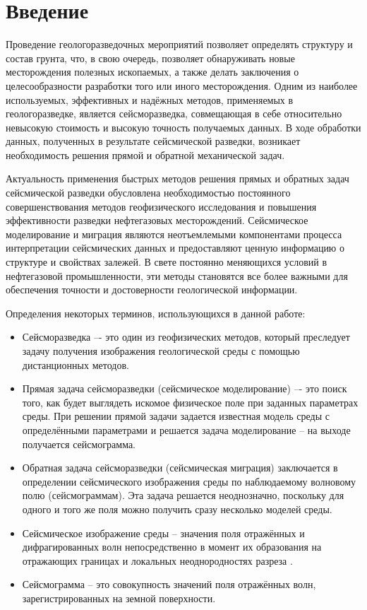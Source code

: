 \documentclass[a4paper, fontsize=14pt]{article}
\begin{document}
 
	\tableofcontents
	\newpage
	\section*{Введение} 
	
	Проведение геологоразведочных мероприятий позволяет определять структуру
	и состав грунта, что, в свою очередь, позволяет обнаруживать новые
	месторождения полезных ископаемых, а также делать заключения о
	целесообразности разработки того или иного месторождения.
	Одним из наиболее используемых, эффективных и надёжных методов,
	применяемых в геологоразведке, является сейсморазведка, совмещающая в себе
	относительно невысокую стоимость и высокую точность получаемых данных.  
	В ходе обработки данных, полученных в результате сейсмической разведки, 
	возникает необходимость решения прямой и обратной механической задач.
	
	Актуальность применения быстрых методов решения прямых и обратных задач сейсмической разведки обусловлена необходимостью постоянного совершенствования методов геофизического исследования и повышения эффективности разведки нефтегазовых месторождений. Сейсмическое моделирование и миграция являются неотъемлемыми компонентами процесса интерпретации сейсмических данных и предоставляют ценную информацию о структуре и свойствах залежей. В свете постоянно меняющихся условий в нефтегазовой промышленности, эти методы становятся все более важными для обеспечения точности и достоверности геологической информации.
	
	Определения некоторых терминов, использующихся в данной работе:
	\begin{itemize}
		\item Сейсморазведка –- это один из геофизических методов, который преследует задачу
		получения изображения геологической среды с помощью дистанционных методов. 
		
		\item Прямая задача сейсморазведки (сейсмическое моделирование) –- это поиск того, как будет выглядеть 
		искомое физическое поле при заданных параметрах среды. При решении прямой задачи 
		задается известная модель среды с определёнными параметрами и решается задача
		моделирование – на выходе получается сейсмограмма.
		
		\item Обратная задача сейсморазведки (сейсмическая миграция) заключается в определении сейсмического изображения среды по
		наблюдаемому волновому полю (сейсмограммам). Эта задача решается неоднозначно,
		поскольку для одного и того же поля можно получить сразу несколько моделей среды.
		
		\item Сейсмическое изображение среды --  значения поля 	отражённых и дифрагированных волн непосредственно в момент их образования на отражающих границах и локальных неоднородностях	разреза \cite{timoshin}.
		
		\item Сейсмограмма -- это совокупность значений поля отражённых волн, зарегистрированных на земной поверхности.   
	\end{itemize}
\end{document}
